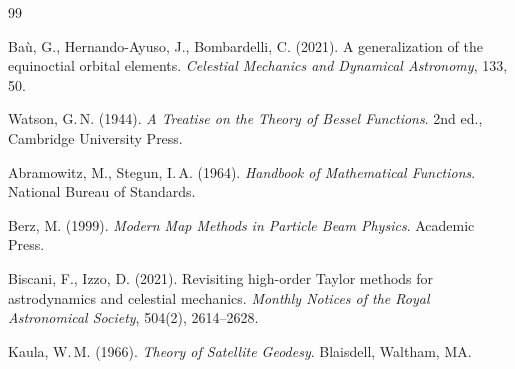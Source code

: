 \documentclass[11pt]{article}
\begin{document}
\begin{thebibliography}{99}

Ba\`u, G., Hernando-Ayuso, J., Bombardelli, C. (2021).
A generalization of the equinoctial orbital elements.
\textit{Celestial Mechanics and Dynamical Astronomy}, 133, 50.

Watson, G.\,N. (1944).
\textit{A Treatise on the Theory of Bessel Functions}.
2nd ed., Cambridge University Press.

Abramowitz, M., Stegun, I.\,A. (1964).
\textit{Handbook of Mathematical Functions}.
National Bureau of Standards.

Berz, M. (1999).
\textit{Modern Map Methods in Particle Beam Physics}.
Academic Press.

Biscani, F., Izzo, D. (2021).
Revisiting high-order Taylor methods for astrodynamics and celestial
mechanics.
\textit{Monthly Notices of the Royal Astronomical Society}, 504(2),
2614--2628.

Kaula, W.\,M. (1966).
\textit{Theory of Satellite Geodesy}.
Blaisdell, Waltham, MA.

\end{thebibliography}
\end{document}
